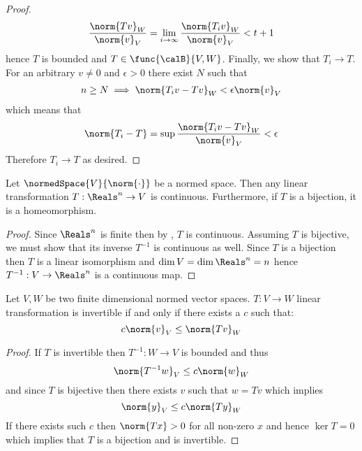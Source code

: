 \begin{proof}
    \begin{equation*}
        \dfrac{\norm{Tv}_W}{\norm{v}_V} = \lim_{i \to \infty}  \dfrac{\norm{T_i v}_W}{\norm{v}_V} < t + 1
    \end{equation*}
    hence \(T\) is bounded and \(T \in \func{\calB}{V,W}\). Finally, we show that \(T_i \to T\). For an arbitrary \(v \neq 0\) and \(\epsilon > 0\) there exist \(N\) such that
    \begin{align*}
        n \geq N \implies \norm{T_i v - Tv}_W < \epsilon \norm{v}_V
    \end{align*}
    which means that
    \begin{equation*}
        \norm{T_i - T} = \sup \dfrac{\norm{T_i v - Tv}_W}{\norm{v}_V} < \epsilon
    \end{equation*}
    Therefore \(T_i \to T\) as desired.
\end{proof}

\begin{theorem}
    Let \(\normedSpace{V}{\norm{\cdot}}\) be a normed space. Then any linear transformation \(T: \Reals^n \to V\) is continuous. Furthermore, if \(T\) is a bijection, it is a homeomorphism.
\end{theorem}

\begin{proof}
    Since \(\Reals^n\) is finite then by , \(T\) is continuous. Assuming \(T\) is bijective, we must show that its inverse \(T^{-1}\) is continuous as well. Since \(T\) is a bijection then \(T\) is a linear isomorphism and \(\dim V = \dim \Reals^n = n\) hence \(T^{-1}: V \to \Reals^n\) is a continuous map.
\end{proof}


\begin{theorem} \label{th:LinearInvertibility}
    Let \(V,W\) be two finite dimensional normed vector spaces. \(T : V \to W\) linear transformation is invertible if and only if there exists a \(c\) such that:
    \begin{equation*}
        c \norm{v}_V \leq \norm{Tv}_W
    \end{equation*}
\end{theorem}

\begin{proof}
    If \(T\) is invertible then \(T^{-1} : W \to V \) is bounded and thus
    \begin{equation*}
        \norm{T^{-1}w}_V \leq c \norm{w}_W
    \end{equation*}
    and since \(T\) is bijective then there exists \(v\) such that \(w = Tv\) which implies
    \begin{equation*}
        \norm{y}_V \leq c\norm{Ty}_W
    \end{equation*}
    If there exists such \(c\) then \(\norm{Tx} > 0\) for all non-zero \(x\) and hence \(\ker T  = 0\) which implies that \(T\) is a bijection and is invertible.
\end{proof}

